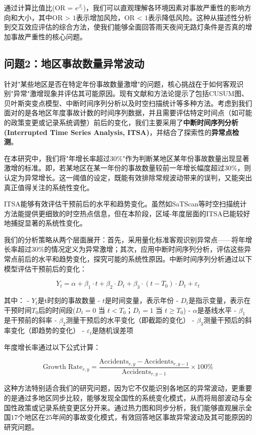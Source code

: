 \documentclass[12pt,a4paper]{article}
\begin{document}
通过计算比值比(OR = $e^{\beta_i}$)，我们可以直观理解各环境因素对事故严重性的影响方向和大小，其中OR > $1$表示增加风险，OR < $1$表示降低风险。这种从描述性分析到交互效应评估的综合方法，使我们能够全面回答雨天夜间无路灯条件是否真的增加事故严重性的核心问题。

\subsection{问题2：地区事故数量异常波动}

针对"某些地区是否在特定年份事故数量激增"的问题，核心挑战在于如何客观识别"异常"激增现象并评估其可能原因。现有文献和方法论提示了包括CUSUM图、贝叶斯突变点模型、中断时间序列分析以及时空扫描统计等多种方法。考虑到我们面对的是各地区年度事故计数的时间序列数据，并且需要评估特定时间点（如可能的政策变更或记录系统调整）前后的变化，我们主要采用了\textbf{中断时间序列分析(Interrupted Time Series Analysis, ITSA)}，并结合了探索性的\textbf{异常点检测}。

在本研究中，我们将"年增长率超过$30\%$"作为判断某地区某年份事故数量出现显著激增的标准。即，若某地区在某一年份的事故数量较前一年增长幅度超过$30\%$，则认定为异常增长。这一阈值的设定，既能有效排除常规波动带来的误判，又能突出真正值得关注的系统性变化。

ITSA能够有效评估干预前后的水平和趋势变化。虽然如SaTScan等时空扫描统计方法能提供更细致的时空热点信息，但在本阶段，区域-年度层面的ITSA已能较好地捕捉显著的系统性变化。

我们的分析策略从两个层面展开：首先，采用量化标准客观识别异常点——将年增长率超过$30\%$的情况定义为异常激增；其次，应用中断时间序列分析，评估这些异常点前后的水平和趋势变化，探究可能的系统性原因。中断时间序列分析通过以下模型评估干预前后的变化：

$$
Y_t = \alpha + \beta_1 \cdot t + \beta_2 \cdot D_t + \beta_3 \cdot (t - T_0) \cdot D_t + \varepsilon_t
$$

其中：
- $Y_t$是t时刻的事故数量
- $t$是时间变量，表示年份
- $D_t$是指示变量，表示在干预时间$T_0$后的时间段($D_t=0$ 当 $t<T_0$；$D_t=1$ 当 $t \geq T_0$)
- $\alpha$是基线水平
- $\beta_1$是干预前的斜率
- $\beta_2$测量干预后的水平变化（即截距的变化）
- $\beta_3$测量干预后的斜率变化（即趋势的变化）
- $\varepsilon_t$是随机误差项

年度增长率通过以下公式计算：

$$
\text{Growth Rate}_{r,y} = \frac{\text{Accidents}_{r,y} - \text{Accidents}_{r,y-1}}{\text{Accidents}_{r,y-1}} \times 100\%
$$

这种方法特别适合我们的研究问题，因为它不仅能识别各地区的异常波动，更重要的是通过多地区同步比较，能够发现全国性的系统变化模式，从而将局部波动与全国性政策或记录系统变更区分开来。通过热力图和同步分析，我们能够直观展示全国$17$个地区在$25$年间的事故变化模式，有效回答地区事故异常波动及其可能原因的研究问题。
\end{document}
